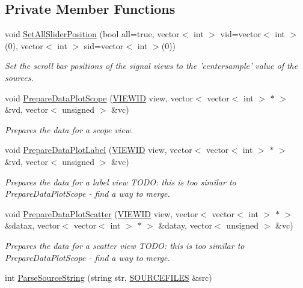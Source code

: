 \subsection*{Private Member Functions}
\begin{CompactItemize}
\item 
void \hyperlink{class_main_window_429d8336b0b052f8a04f1d449afc466d}{SetAllSliderPosition} (bool all=true, vector$<$ int $>$ vid=vector$<$ int $>$(0), vector$<$ int $>$ sid=vector$<$ int $>$(0))
\begin{CompactList}\small\item\em Set the scroll bar positions of the signal views to the 'centersample' value of the sources. \item\end{CompactList}\item 
void \hyperlink{class_main_window_2d0517d35ce319470221b8efe5848170}{PrepareDataPlotScope} (\hyperlink{class_v_i_e_w_i_d}{VIEWID} view, vector$<$ vector$<$ int $>$ $\ast$ $>$ \&vd, vector$<$ unsigned $>$ \&vc)
\begin{CompactList}\small\item\em Prepares the data for a scope view. \item\end{CompactList}\item 
void \hyperlink{class_main_window_744f2ed4507c6639ddbfc3473b74abb7}{PrepareDataPlotLabel} (\hyperlink{class_v_i_e_w_i_d}{VIEWID} view, vector$<$ vector$<$ int $>$ $\ast$ $>$ \&vd, vector$<$ unsigned $>$ \&vc)
\begin{CompactList}\small\item\em Prepares the data for a label view TODO: this is too similar to PrepareDataPlotScope - find a way to merge. \item\end{CompactList}\item 
void \hyperlink{class_main_window_c8a412fbe071fe068e408efbf6206089}{PrepareDataPlotScatter} (\hyperlink{class_v_i_e_w_i_d}{VIEWID} view, vector$<$ vector$<$ int $>$ $\ast$ $>$ \&datax, vector$<$ vector$<$ int $>$ $\ast$ $>$ \&datay, vector$<$ unsigned $>$ \&vc)
\begin{CompactList}\small\item\em Prepares the data for a scatter view TODO: this is too similar to PrepareDataPlotScope - find a way to merge. \item\end{CompactList}\item 
int \hyperlink{class_main_window_165581a8c1eed85fce4920110a661d8b}{ParseSourceString} (string str, \hyperlink{data_8h_1c37d931f88ec88b85ab2086a6f09809}{SOURCEFILES} \&src)

\end{CompactItemize}
